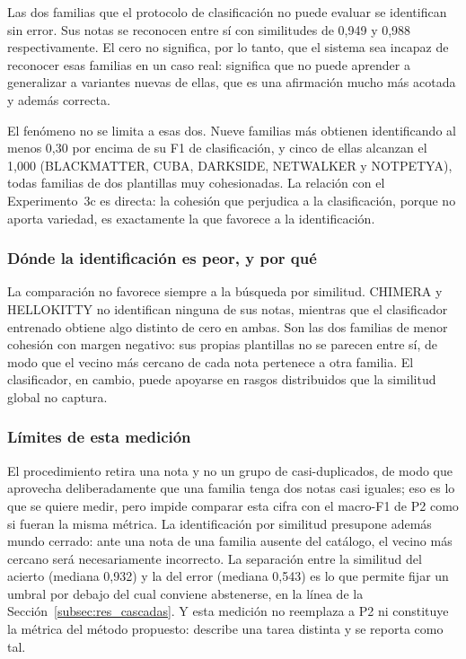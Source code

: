Las dos familias que el protocolo de clasificación no puede evaluar se identifican sin error. Sus notas se reconocen entre sí con similitudes de 0,949 y 0,988 respectivamente. El cero no significa, por lo tanto, que el sistema sea incapaz de reconocer esas familias en un caso real: significa que no puede aprender a generalizar a variantes nuevas de ellas, que es una afirmación mucho más acotada y además correcta.

El fenómeno no se limita a esas dos. Nueve familias más obtienen identificando al menos 0,30 por encima de su F1 de clasificación, y cinco de ellas alcanzan el 1,000 (BLACKMATTER, CUBA, DARKSIDE, NETWALKER y NOTPETYA), todas familias de dos plantillas muy cohesionadas. La relación con el Experimento~3c es directa: la cohesión que perjudica a la clasificación, porque no aporta variedad, es exactamente la que favorece a la identificación.

\subsubsection*{Dónde la identificación es peor, y por qué}

La comparación no favorece siempre a la búsqueda por similitud. CHIMERA y HELLOKITTY no identifican ninguna de sus notas, mientras que el clasificador entrenado obtiene algo distinto de cero en ambas. Son las dos familias de menor cohesión con margen negativo: sus propias plantillas no se parecen entre sí, de modo que el vecino más cercano de cada nota pertenece a otra familia. El clasificador, en cambio, puede apoyarse en rasgos distribuidos que la similitud global no captura.

\subsubsection*{Límites de esta medición}

El procedimiento retira una nota y no un grupo de casi-duplicados, de modo que aprovecha deliberadamente que una familia tenga dos notas casi iguales; eso es lo que se quiere medir, pero impide comparar esta cifra con el macro-F1 de P2 como si fueran la misma métrica. La identificación por similitud presupone además mundo cerrado: ante una nota de una familia ausente del catálogo, el vecino más cercano será necesariamente incorrecto. La separación entre la similitud del acierto (mediana 0,932) y la del error (mediana 0,543) es lo que permite fijar un umbral por debajo del cual conviene abstenerse, en la línea de la Sección~\ref{subsec:res_cascadas}. Y esta medición no reemplaza a P2 ni constituye la métrica del método propuesto: describe una tarea distinta y se reporta como tal.


